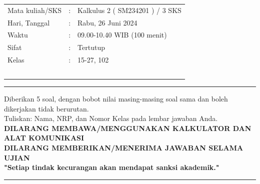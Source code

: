 \documentclass[10pt,openany,a4paper]{article}
\theoremstyle{definition}
\theoremstyle{definition}
\theoremstyle{plain}
\begin{document}
    \begin{center}
	\begin{tabular}{lcl}
		Mata kuliah/SKS & : & Kalkulus 2 ( SM234201 ) / 3 SKS\\
		Hari, Tanggal & : & Rabu, 26 Juni 2024\\
		Waktu & : & 09.00-10.40 WIB (100 menit)\\
		Sifat & : & Tertutup\\
		Kelas & : & 15-27, 102\\
  ~
	\end{tabular}

    \noindent\rule{\textwidth}{2.pt}
    \noindent Diberikan 5 soal, dengan bobot nilai masing-masing soal sama dan boleh dikerjakan tidak berurutan.\\
    Tuliskan: Nama, NRP, dan Nomor Kelas pada lembar jawaban Anda.\\
    \textbf{\MakeUppercase{dilarang membawa/menggunakan kalkulator dan alat komunikasi}}\\
    {\textbf{\MakeUppercase{dilarang memberikan/menerima jawaban selama ujian}}}\\
    {\textbf{"Setiap tindak kecurangan akan mendapat sanksi akademik."}}

	
    \noindent\rule{\textwidth}{2.pt}
        \end{center}
\end{document}
